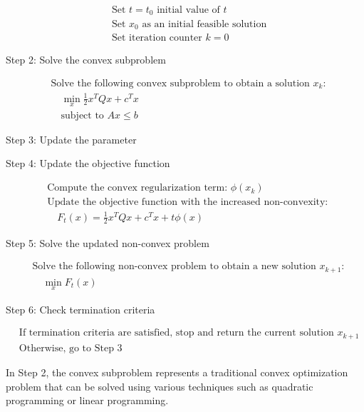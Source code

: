 \begin{align*}
&\text{Set } t = t_0 \text{ initial value of } t \\
&\text{Set } x_0 \text{ as an initial feasible solution} \\
&\text{Set iteration counter } k = 0
\end{align*}


Step 2: Solve the convex subproblem

\begin{align*}
&\text{Solve the following convex subproblem to obtain a solution } x_k: \\
&\quad \min_{x} \frac{1}{2}x^TQx + c^Tx \\
&\quad \text{subject to } Ax \leq b
\end{align*}

Step 3: Update the parameter 

Step 4: Update the objective function

\begin{align*}
&\text{Compute the convex regularization term: } \phi(x_k) \\
&\text{Update the objective function with the increased non-convexity: } \\
&\quad F_t(x) = \frac{1}{2}x^TQx + c^Tx + t\phi(x)
\end{align*}

Step 5: Solve the updated non-convex problem

\begin{align*}
&\text{Solve the following non-convex problem to obtain a new solution } x_{k+1}: \\
&\quad \min_{x} F_t(x)
\end{align*}

Step 6: Check termination criteria

\begin{align*}
&\text{If termination criteria are satisfied, stop and return the current solution } x_{k+1} \\
&\text{Otherwise, go to Step 3}
\end{align*}

In Step 2, the convex subproblem represents a traditional convex optimization problem that can be solved using various techniques such as quadratic programming or linear programming.

